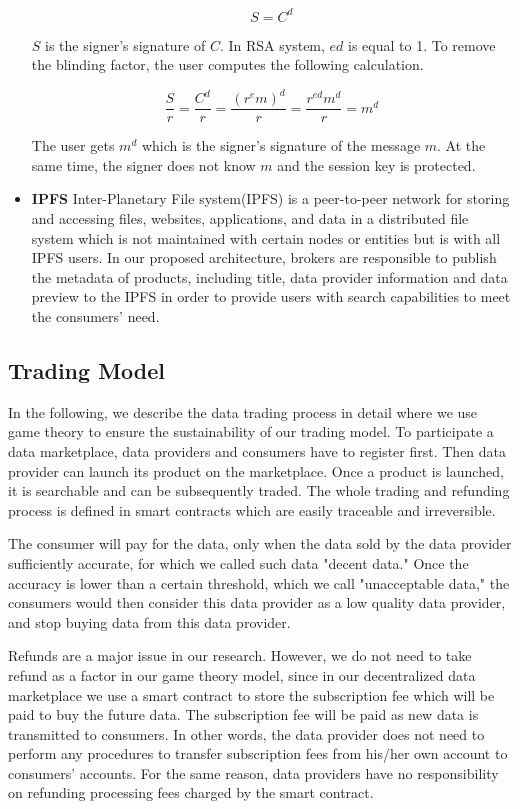 \documentclass[journal,article,applsci,submit,moreauthors,pdftex]{Definitions/mdpi}
\begin{document}
\begin{itemize}[leftmargin=*,labelsep=5.8mm]
\begin{equation}
S = C^d
\end{equation}

$S$ is the signer's signature of $C$. In RSA system, $ed$ is equal to 1. To remove the blinding factor, the user computes the following calculation.

\begin{equation}
\frac{S}{r}= \frac{C^d}{r} = \frac{(r^e m)^d}{r} = \frac{r^{ed} m^d}{r} = m^d
\end{equation}
 
The user gets $m^d$ which is the signer's signature of the message $m$. At the same time, the signer does not know $m$ and the session key is protected. 

\item \textbf{IPFS}
Inter-Planetary File system(IPFS)\cite{IPFS} is a peer-to-peer network for storing and accessing files, websites, applications, and data in a distributed file system which is not maintained with certain nodes or entities but is with all IPFS users. In our proposed architecture, brokers are responsible to publish the metadata of products, including title, data provider information and data preview to the IPFS in order to provide users with search capabilities to meet the consumers' need.
\end{itemize}

\subsection{Trading Model}
In the following, we describe the data trading process in detail where we use game theory to ensure the sustainability of our trading model. To participate a data marketplace, data providers and consumers have to register first. Then data provider can launch its product on the marketplace. Once a product is launched, it is searchable and can be subsequently traded. The whole trading and refunding process is defined in smart contracts which are easily traceable and irreversible.

The consumer will pay for the data, only when the data sold by the data provider sufficiently accurate, for which we called such data "decent data."
Once the accuracy is lower than a certain threshold, which we call "unacceptable data," the consumers would then consider this data provider as a low quality data provider, and stop buying data from this data provider.

Refunds are a major issue in our research. However, we do not need to take refund as a factor in our game theory model, since in our decentralized data marketplace we use a smart contract to store the subscription fee which will be paid to buy the future data. The subscription fee will be paid as new data is transmitted to consumers. In other words, the data provider does not need to perform any procedures to transfer subscription fees from his/her own account to consumers' accounts. For the same reason, data providers have no responsibility on refunding processing fees charged by the smart contract.
\end{document}
